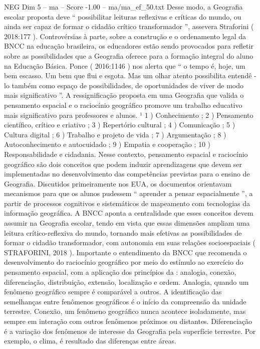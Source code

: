 \begin{textsample}{NEG Dim 5 – ma – Score -1.00 – ma/ma\_ef\_50.txt}
Desse modo, a Geografia escolar proposta deve “ possibilitar leituras reflexivas e críticas do mundo, ou ainda ser capaz de formar o cidadão crítico transformador ”, assevera Straforini ( 2018:177 ).
Controvérsias à parte, sobre a construção e o ordenamento legal da BNCC na educação brasileira, os educadores estão sendo provocados para refletir sobre as possibilidades que a Geografia oferece para a formação integral do aluno na Educação Básica.
Ponce ( 2016:1146 ) nos alerta que “ o tempo é, hoje, um bem escasso.
Um bem que flui e esgota.
Mas um olhar atento possibilita entendê -lo também como espaço de possibilidades, de oportunidades de viver de modo mais significativo ”.
A ressignificação proposta em uma Geografia que valida o pensamento espacial e o raciocínio geográfico promove um trabalho educativo mais significativo para professores e alunos. ¹ 1 ) Conhecimento ; 2 ) Pensamento científico, crítico e criativo ; 3 ) Repertório cultural ; 4 ) Comunicação ; 5 ) Cultura digital ; 6 ) Trabalho e projeto de vida ; 7 ) Argumentação ; 8 ) Autoconhecimento e autocuidado ; 9 ) Empatia e cooperação ; 10 ) Responsabilidade e cidadania.
Nesse contexto, pensamento espacial e raciocínio geográfico são dois conceitos que podem induzir aprendizagens que devem ser implementadas no desenvolvimento das competências previstas para o ensino de Geografia.
Discutidos primeiramente nos EUA, os documentos orientavam mecanismos para que os alunos pudessem “ aprender a pensar espacialmente ”, a partir de processos cognitivos e sistemáticos de mapeamento com tecnologias da informação geográfica.
A BNCC aponta a centralidade que esses conceitos devem assumir na Geografia escolar, tendo em vista que essas dimensões ampliam uma leitura crítico-reflexiva do mundo, tornando mais efetivas as possibilidades de formar o cidadão transformador, com autonomia em suas relações socioespaciais ( STRAFORINI, 2018 ).
Importante o entendimento da BNCC que recomenda o desenvolvimento do raciocínio geográfico por meio do estímulo ao exercício do pensamento espacial, com a aplicação dos princípios da : analogia, conexão, diferenciação, distribuição, extensão, localização e ordem.
Analogia, quando um fenômeno geográfico sempre é comparável a outros.
A identificação das semelhanças entre fenômenos geográficos é o início da compreensão da unidade terrestre.
Conexão, um fenômeno geográfico nunca acontece isoladamente, mas sempre em interação com outros fenômenos próximos ou distantes.
Diferenciação é a variação dos fenômenos de interesse da Geografia pela superfície terrestre.
Por exemplo, o clima, é resultado das diferenças entre áreas.

\end{textsample}
